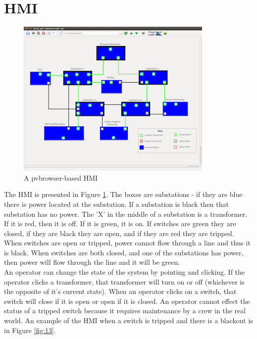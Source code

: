 \documentclass[oneside,11pt,a4paper,oldfontcommands]{book}
\begin{document}
\section{HMI}
\begin{figure}[ht]
  \begin{center}
  \includegraphics{normal_operation}
  \caption{A pvbrowser-based HMI}
  \label{fig:5}
  \end{center}
\end{figure}

\indent \indent
The HMI is presented in Figure \ref{fig:5}. The boxes are substations - if they are
blue there is power located at the substation.  If a substation is black then that
substation has no power. The 'X' in the middle of a substation is a transformer. 
If it is red, then it is off. If it is green, it is on.
If switches are green
they are closed, if they are black they are open, and if they are red they are tripped.
 When switches
are open or tripped, power cannot flow through a line and thus it is black. When switches
are both closed, and one of the substations has power, then power will flow
through the line and it will be green. \\

\indent
An operator can change the state of the system by pointing and clicking. If the operator
clicks a transformer, that transformer will turn on or off (whichever is the opposite
of it's current state). When an operator
clicks on a switch, that switch will close if it is open or open if it is closed. An
operator cannot effect the status of a tripped switch because it requires maintenance
by a crew in the real world. An example of the HMI when a switch is tripped and there
is a blackout is in Figure \ref{fig:13}.
\end{document}
